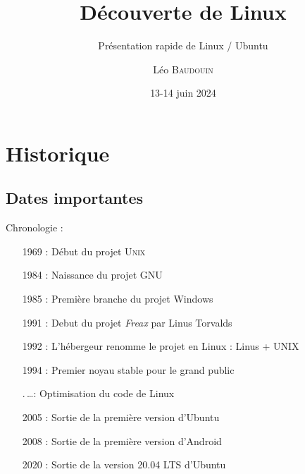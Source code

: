 \documentclass{beamer}
\title[Pr\'esentation Linux]{D\'ecouverte de Linux}
\subtitle{Présentation rapide de Linux / Ubuntu}
\author{L\'eo \textsc{Baudouin}}
\institute{
  {\url{baudouin.leo @ gmail.com}}
}
\date{13-14 juin 2024}
\begin{document}
\begin{frame}
\titlepage
\end{frame}

\begin{frame}
\tableofcontents
\end{frame}


\section{Historique}
\subsection{Dates importantes}
\begin{frame}
  \begin{block}{Chronologie :}
   ~~~~\begin{minipage}{\linewidth}
      \begin{itemize}
      \item[1969 :] Début du projet U\textsc{nix}
      \item[1984 :] Naissance du projet GNU
      \item[1985 :] Première branche du projet Windows
      \item[1991 :] Debut du projet \textit{Freax} par Linus Torvalds
      \item[1992 :] L'h\'ebergeur renomme le projet en Linux : Linus + UNIX
      \item[1994 :] Premier noyau stable pour le grand public
      \item[.\,\dots :] Optimisation du code de Linux
      \item[2005 :] Sortie de la première version d'Ubuntu
      \item[2008 :] Sortie de la première version d'Android
      \item[2020 :] Sortie de la version 20.04 LTS d'Ubuntu
      \end{itemize}
    \end{minipage}
  \end{block}
\end{frame}
\end{document}
